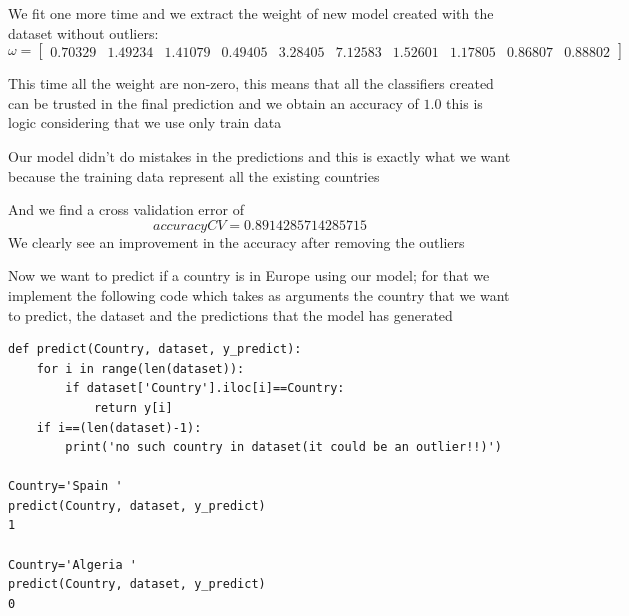 \documentclass[12pt,a4paper]{report}
\begin{document}
We fit one more time  and we extract the weight of new model created with the dataset without outliers:
$$\omega= \left[ \begin{array}{cccccccccc}
0.70329 &1.49234& 1.41079 &0.49405& 3.28405& 7.12583&
 1.52601 &1.17805 &0.86807 &0.88802 \end{array} \right]$$

This time all the weight are non-zero, this means that all the classifiers created can be trusted in the final prediction 
and we obtain an accuracy of $1.0$ this is logic considering that we use only train data

Our model didn't do mistakes in the predictions and this is exactly what we want because the training data represent all the existing countries  

And we find a cross validation error of $$ accuracy CV= 0.8914285714285715 $$
We clearly see an improvement in the accuracy after removing the outliers 

Now we want to predict if a country is in Europe using our model; for that we implement the following code which takes as arguments the country that we want to predict, the dataset and the predictions that the model has generated  
\begin{verbatim}
def predict(Country, dataset, y_predict):
    for i in range(len(dataset)):
        if dataset['Country'].iloc[i]==Country:
            return y[i]
    if i==(len(dataset)-1):
        print('no such country in dataset(it could be an outlier!!)') 
        
Country='Spain '
predict(Country, dataset, y_predict)
1

Country='Algeria '
predict(Country, dataset, y_predict)
0 
 
\end{verbatim}
\end{document}
